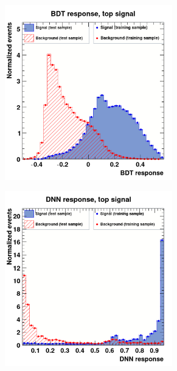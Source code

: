 \documentclass[main]{subfiles} %
\begin{document}
\begin{figure}[H]
     \centering
     \begin{subfigure}[h]{0.49\textwidth}
         \centering
         \includegraphics[width=0.8\textwidth]{../Figures/Results/overtraining/top_overtraining_BDT.png}
          \caption{}
         \label{fig:top_BDT_overtraining}
     \end{subfigure}
     \begin{subfigure}[h]{0.49\textwidth}
         \centering
         \includegraphics[width=0.8\textwidth]{../Figures/Results/overtraining/top_overtraining_DNN.png}

\end{subfigure}
\end{figure}
\end{document}

